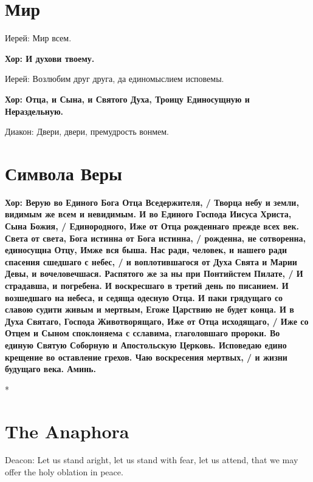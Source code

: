 \documentclass[12pt,a4paper,titlepage]{report}
\begin{document}
\begin{paracol}[1]{2}
  \switchcolumn[1]

  \section*{Мир}

  Иерей: Мир всем.

  \textbf{Хор: И духови твоему.}

  Иерей: Возлюбим друг друга, да единомыслием исповемы.

  \textbf{Хор: Отца, и Сына, и Святого Духа, Троицу Единосущную и Нераздельную.}

  Диакон: Двери, двери, премудрость вонмем.

  \section*{Символа Веры}

  \textbf{Хор: Верую во Единого Бога Отца Вседержителя, / Творца небу и земли, видимым же всем и невидимым.
    И во Единого Господа Иисуса Христа, Сына Божия, / Единородного, Иже от Отца рожденнаго прежде всех век.
    Света от света, Бога истинна от Бога истинна, / рожденна, не сотворенна, единосущна Отцу, Имже вся быша.
    Нас ради, человек, и нашего ради спасения сшедшаго с небес, / и воплотившагося от Духа Свята и Марии Девы, и вочеловечшася.
    Распятого же за ны при Понтийстем Пилате, / И страдавша, и погребена. И воскресшаго в третий день по писанием.
    И возшедшаго на небеса, и седяща одесную Отца. И паки грядущаго со славою судити живым и мертвым, Егоже Царствию не будет конца.
    И в Духа Святаго, Господа Животворящаго, Иже от Отца исходящаго, / Иже со Отцем и Сыном споклоняема с сславима, глаголовшаго пророки.
    Во единую Святую Соборную и Апостольскую Церковь. Исповедаю едино крещение во оставление грехов.
    Чаю воскресения мертвых, / и жизни будущаго века. Аминь.}

  \switchcolumn[0]*

  \section*{The Anaphora}

  Deacon: Let us stand aright, let us stand with fear, let us attend, that we may offer the holy oblation in peace.


\end{paracol}
\end{document}
